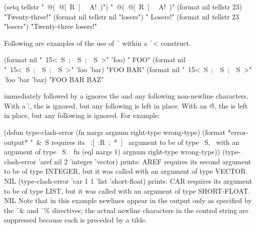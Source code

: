 \code
 (setq tellstr "~@(~@[~R~]~{\hat} ~A!~)")
\EV "~@(~@[~R~]~{\hat} ~A!~)"
 (format nil tellstr 23) \EV "Twenty-three!"
 (format nil tellstr nil "losers") \EV " Losers!"
 (format nil tellstr 23 "losers") \EV "Twenty-three losers!"
\endcode

Following are examples of the use of \f{~{\hat}} 
within a \f{~<} construct.

\code
 (format nil "~15<~S~;~{\hat}~S~;~{\hat}~S~>" 'foo)
\EV  "            FOO"
 (format nil "~15<~S~;~{\hat}~S~;~{\hat}~S~>" 'foo 'bar)
\EV  "FOO         BAR"
 (format nil "~15<~S~;~{\hat}~S~;~{\hat}~S~>" 'foo 'bar 'baz)
\EV  "FOO   BAR   BAZ"
\endcode

\endsubsubsection%



 immediately followed by a  ignores the 
and any following non-newline  characters.
With a \f{:},
 the  is ignored, 
 but any following  is left in place.
With an \f{@},
 the  is left in place,
 but any following  is ignored.
For example:

\code
 (defun type-clash-error (fn nargs argnum right-type wrong-type)
   (format *error-output*
           "~&~S requires its ~:[~:R~;~*~]~ 
           argument to be of type ~S,~%
           with an argument of type ~S.~%
           fn (eql nargs 1) argnum right-type wrong-type))
 (type-clash-error 'aref nil 2 'integer 'vector)  prints:
AREF requires its second argument to be of type INTEGER,
but it was called with an argument of type VECTOR.
NIL
 (type-clash-error 'car 1 1 'list 'short-float)  prints:
CAR requires its argument to be of type LIST,
but it was called with an argument of type SHORT-FLOAT.
NIL
\endcode
Note that in this example newlines appear in the output only as specified
by the \f{~\&} and \f{~\%} directives; the 
actual newline characters
in the control string are suppressed because each is preceded by a tilde.
                                                                     
\endsubsubsection%

\endsubsection%

